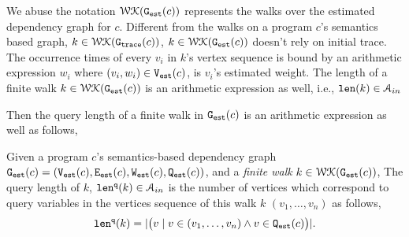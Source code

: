   We abuse the notation $\mathcal{WK}(\mathtt{{G_{est}}}(c))$ represents the walks over the estimated dependency graph for $c$.
Different from the walks on a program $c$'s semantics based graph,
 $k \in \mathcal{WK}(\mathtt{{G_{trace}}}(c))$, 
$k \in \mathcal{WK}(\mathtt{{G_{est}}}(c))$ doesn't rely on initial trace.
The occurrence times of every $v_i $ in $k$'s vertex sequence is bound by 
an arithmetic expression $w_i$ where $(v_i, w_i) \in \mathtt{{V_{est}}}(c)$, is $v_i$'s estimated weight. 
 The length of a finite walk $k \in \mathcal{WK}(\mathtt{{G_{est}}}(c))$ is an arithmetic expression
 as well, i.e., $\mathtt{len}(k) \in \mathcal{A}_{in}$

 Then the query length of a finite walk in  $\mathtt{{G_{est}}}(c)$ is an arithmetic expression as well as follows,
\begin{defn}
  \label{def:qlen}
  Given 
  a program $c$'s semantics-based dependency graph 
  $\mathtt{{G_{est}}}({c}) = (\mathtt{{V_{est}}}(c), \mathtt{{E_{est}}}(c), \mathtt{{W_{est}}}(c), \mathtt{{Q_{est}}}(c))$, 
   and a \emph{finite walk} $k \in \mathcal{WK}(\mathtt{{G_{est}}}(c))$,
  The query length of $k$, $\mathtt{len}^{\tt q}(k) \in \mathcal{A}_{in}$ 
  is the number of vertices which correspond to query variables in the vertices sequence of this walk $k$
  $(v_1, \ldots, v_{n})$ as follows, 
  \[
    \mathtt{len}^{\tt q}(k) = |\big( v \mid v \in (v_1, \ldots, v_{n}) \land v \in \mathtt{{Q_{est}}}(c) \big)|.
  \]
  \end{defn}
